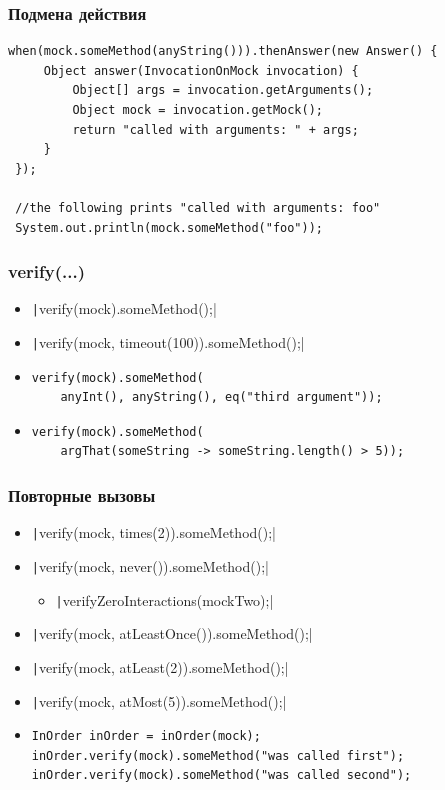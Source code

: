 \documentclass[xetex,mathserif,serif]{beamer}
\begin{document}
	\begin{frame}[fragile]
		\frametitle{Подмена действия}
		\begin{verbatim}
when(mock.someMethod(anyString())).thenAnswer(new Answer() {
     Object answer(InvocationOnMock invocation) {
         Object[] args = invocation.getArguments();
         Object mock = invocation.getMock();
         return "called with arguments: " + args;
     }
 });
 
 //the following prints "called with arguments: foo"
 System.out.println(mock.someMethod("foo"));
		\end{verbatim}
	\end{frame}

	\begin{frame}[fragile]
		\frametitle{verify(...)}
		\begin{itemize}
			\item \texttt|verify(mock).someMethod();|
			\pause
			\item \texttt|verify(mock, timeout(100)).someMethod();|
			\pause
			\item 
				\begin{verbatim}
verify(mock).someMethod(
    anyInt(), anyString(), eq("third argument"));
				\end{verbatim}
			\pause
			\item 
				\begin{verbatim}
verify(mock).someMethod(
    argThat(someString -> someString.length() > 5));
				\end{verbatim}
		\end{itemize}
	\end{frame}

	\begin{frame}[fragile]
		\frametitle{Повторные вызовы}
		\begin{itemize}
			\item \texttt|verify(mock, times(2)).someMethod();|
			\pause
			\item \texttt|verify(mock, never()).someMethod();|
			\begin{itemize}
				\item \texttt|verifyZeroInteractions(mockTwo);|
			\end{itemize}
			\pause
			\item \texttt|verify(mock, atLeastOnce()).someMethod();|
			\pause
			\item \texttt|verify(mock, atLeast(2)).someMethod();|
			\pause
			\item \texttt|verify(mock, atMost(5)).someMethod();|
			\pause
			\item 
				\begin{verbatim}
InOrder inOrder = inOrder(mock);
inOrder.verify(mock).someMethod("was called first");
inOrder.verify(mock).someMethod("was called second");
				\end{verbatim}
		\end{itemize}
	\end{frame}
\end{document}

